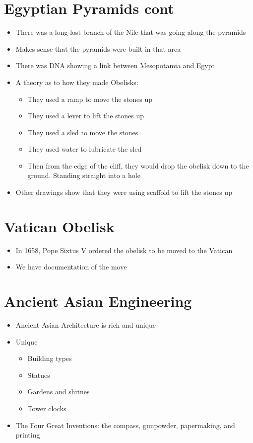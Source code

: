 \documentclass{article}
\begin{document}
\section*{ Egyptian Pyramids cont}
\begin{itemize}
  \item There was a long-lost branch of the Nile that was going along the pyramids
  \item Makes sense that the pyramids were built in that area
  \item There was DNA showing a link between Mesopotamia and Egypt
  \item A theory as to how they made Obelisks:
    \begin{itemize}
      \item They used a ramp to move the stones up
      \item They used a lever to lift the stones up
      \item They used a sled to move the stones
      \item They used water to lubricate the sled
      \item Then from the edge of the cliff, they would drop the obelisk down
        to the ground. Standing straight into a hole
    \end{itemize}
  \item Other drawings show that they were using scaffold to lift the stones up
\end{itemize}

\section*{Vatican Obelisk}
\begin{itemize}
  \item In 1658, Pope Sixtus V ordered the obelisk to be moved to the Vatican
  \item We have documentation of the move
\end{itemize}

\section{Ancient Asian Engineering}
\begin{itemize}
  \item Ancient Asian Architecture is rich and unique
  \item Unique
    \begin{itemize}
      \item Building types
      \item Statues
      \item Gardens and shrines
      \item Tower clocks
    \end{itemize}
  \item The Four Great Inventions: the compass, gunpowder, papermaking, and printing
\end{itemize}
\end{document}

